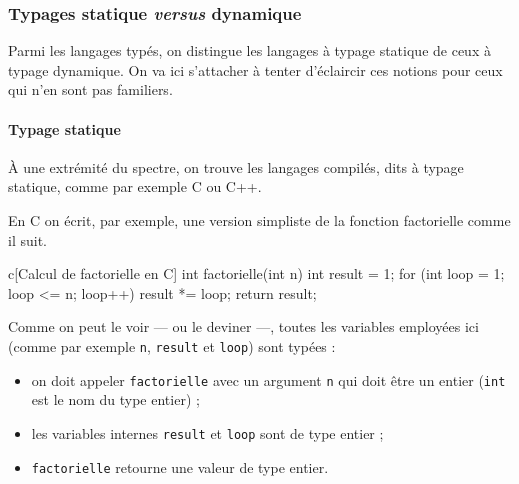\subsubsection[Typages statique \textit{versus} dynamique]{Typages statique \textit{versus} dynamique}
\label{subsub:X.2.2.3}

Parmi les langages typés, on distingue les langages à typage statique de ceux à typage dynamique. On va ici s'attacher à tenter d'éclaircir ces notions pour ceux qui n'en sont pas familiers.

\paragraph{Typage statique} À une extrémité du spectre, on trouve les langages compilés, dits à typage statique, comme par exemple C ou C++.

En C on écrit, par exemple, une version simpliste de la fonction factorielle comme il suit.

\begin{code*}[before skip=6pt, after skip=6pt]{c}[Calcul de factorielle en C]
int factorielle(int n) {
    int result = 1;
    for (int loop = 1; loop <= n; loop++)
        result *= loop;
    return result;
}
\end{code*}

Comme on peut le voir --- ou le deviner ---, toutes les variables employées ici (comme par exemple \texttt{n}, \texttt{result} et \texttt{loop}) sont typées :
\begin{itemize}
	\item on doit appeler \texttt{factorielle} avec un argument \texttt{n} qui doit être un entier (\texttt{int} est le nom du type entier) ;
	\item les variables internes \texttt{result} et \texttt{loop} sont de type entier ;
	\item \texttt{factorielle} retourne une valeur de type entier.
\end{itemize}

